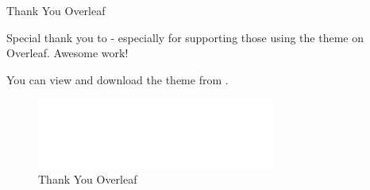 \documentclass[newPxFont,numfooter,sectionpages]{beamer}
\begin{document}
    \begingroup
    \begin{frame}{Thank You Overleaf}
    
    Special thank you to  - especially  for supporting those using the theme on Overleaf. Awesome work!
    
    \vspace{1em}
    
    You can view and download the theme from .
    
    \begin{center}
    \end{center}
    
    \begin{figure}
        \centerline{\includegraphics[width=0.7\textwidth]{overleaf.png}}
    \caption{Thank You Overleaf}
    \end{figure}
    
    
    \end{frame}
    \endgroup
    
    
\end{document}
